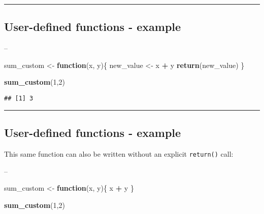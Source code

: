 \documentclass[]{article}
\newenvironment{Shaded}{\begin{snugshade}}{\end{snugshade}}
\newcommand{\ControlFlowTok}[1]{\textcolor[rgb]{0.13,0.29,0.53}{\textbf{#1}}}
\newcommand{\DecValTok}[1]{\textcolor[rgb]{0.00,0.00,0.81}{#1}}
\newcommand{\KeywordTok}[1]{\textcolor[rgb]{0.13,0.29,0.53}{\textbf{#1}}}
\newcommand{\NormalTok}[1]{#1}
\newcommand{\OperatorTok}[1]{\textcolor[rgb]{0.81,0.36,0.00}{\textbf{#1}}}
\newcommand{\StringTok}[1]{\textcolor[rgb]{0.31,0.60,0.02}{#1}}
\begin{document}
\begin{center}\rule{0.5\linewidth}{\linethickness}\end{center}

\hypertarget{user-defined-functions---example}{%
\subsection{User-defined functions -
example}\label{user-defined-functions---example}}

--

\begin{Shaded}
\begin{Highlighting}[]
\NormalTok{sum_custom <-}\StringTok{ }\ControlFlowTok{function}\NormalTok{(x, y)\{}
\NormalTok{  new_value <-}\StringTok{ }\NormalTok{x }\OperatorTok{+}\StringTok{ }\NormalTok{y}
  \KeywordTok{return}\NormalTok{(new_value)}
\NormalTok{\}}

\KeywordTok{sum_custom}\NormalTok{(}\DecValTok{1}\NormalTok{,}\DecValTok{2}\NormalTok{)}
\end{Highlighting}
\end{Shaded}

\begin{verbatim}
## [1] 3
\end{verbatim}

\begin{center}\rule{0.5\linewidth}{\linethickness}\end{center}

\hypertarget{user-defined-functions---example-1}{%
\subsection{User-defined functions -
example}\label{user-defined-functions---example-1}}

This same function can also be written without an explicit
\texttt{return()} call:

--

\begin{Shaded}
\begin{Highlighting}[]
\NormalTok{sum_custom <-}\StringTok{ }\ControlFlowTok{function}\NormalTok{(x, y)\{}
\NormalTok{  x }\OperatorTok{+}\StringTok{ }\NormalTok{y}
\NormalTok{\}}

\KeywordTok{sum_custom}\NormalTok{(}\DecValTok{1}\NormalTok{,}\DecValTok{2}\NormalTok{)}
\end{Highlighting}
\end{Shaded}
\end{document}
